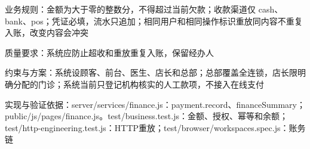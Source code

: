 \documentclass[UTF8,12pt,a4paper,fontset=none]{ctexart}
\begin{document}
业务规则：金额为大于零的整数分，不得超过当前欠款；收款渠道仅 cash、bank、pos；凭证必填，流水只追加；相同用户和相同操作标识重放同内容不重复入账，改变内容会冲突\par
质量要求：系统应防止超收和重放重复入账，保留经办人\par
约束与方案：系统设顾客、前台、医生、店长和总部；总部覆盖全连锁，店长限明确分配的门诊；系统当前只登记机构核实的人工款项，不接入在线支付\par
实现与验证依据：server/\allowbreak{}services/\allowbreak{}finance.\allowbreak{}js：payment.\allowbreak{}record、financeSummary；public/\allowbreak{}js/\allowbreak{}pages/\allowbreak{}finance.\allowbreak{}js。test/\allowbreak{}business.\allowbreak{}test.\allowbreak{}js：金额、授权、幂等和余额；test/\allowbreak{}http-engineering.\allowbreak{}test.\allowbreak{}js：HTTP重放；test/\allowbreak{}browser/\allowbreak{}workspaces.\allowbreak{}spec.\allowbreak{}js：账务链\par
{}
\end{document}
